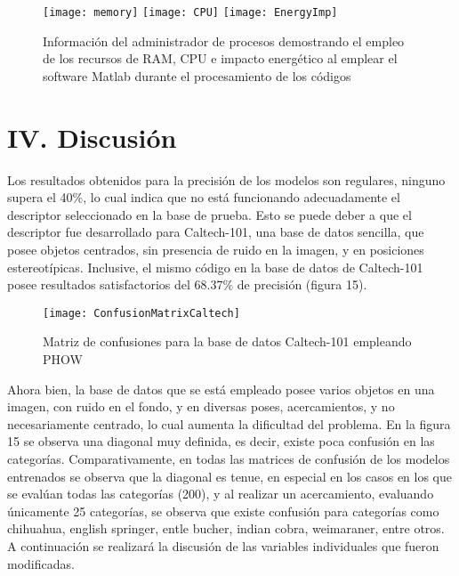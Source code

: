 \documentclass[10pt,twocolumn,letterpaper]{article}
\begin{document}
\begin{figure}
\begin{center}
   \texttt{[image: memory]}
   \texttt{[image: CPU]}
   \texttt{[image: EnergyImp]}
\end{center}
   \caption{Información del administrador de procesos demostrando el empleo de los recursos de RAM, CPU e impacto energético al emplear el software Matlab durante el procesamiento de los códigos}
\end{figure}

\section{\textbf{IV. Discusión}}
Los resultados obtenidos para la precisión de los modelos son regulares, ninguno supera el 40\%, lo cual indica que no está funcionando adecuadamente el descriptor seleccionado en la base de prueba. Esto se puede deber a que el descriptor fue desarrollado para Caltech-101, una base de datos sencilla, que posee objetos centrados, sin presencia de ruido en la imagen, y en posiciones estereotípicas. Inclusive, el mismo código en la base de datos de Caltech-101 posee resultados satisfactorios del 68.37\% de precisión (figura 15). 

\begin{figure}
\begin{center}
   \texttt{[image: ConfusionMatrixCaltech]}

\end{center}
   \caption{Matriz de confusiones para la base de datos Caltech-101 empleando PHOW}
\end{figure}

Ahora bien, la base de datos que se está empleado posee varios objetos en una imagen, con ruido en el fondo, y en diversas poses, acercamientos, y no necesariamente centrado, lo cual aumenta la dificultad del problema. En la figura 15 se observa una diagonal muy definida, es decir, existe poca confusión en las categorías. Comparativamente, en todas las matrices de confusión de los modelos entrenados se observa que la diagonal es tenue, en especial en los casos en los que se evalúan todas las categorías (200), y al realizar un acercamiento, evaluando únicamente 25 categorías, se observa que existe confusión para categorías como chihuahua, english springer, entle bucher, indian cobra, weimaraner, entre otros. A continuación se realizará la discusión de las variables individuales que fueron modificadas.
\end{document}
